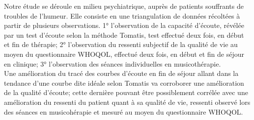   Notre étude se déroule en milieu psychiatrique, 
auprès de patients souffrants de troubles de l'humeur. Elle consiste en une triangulation de données 
récoltées à partir de plusieurs observations.  
1° l'observation de la capacité d'écoute, révélée par un test 
d'écoute selon la méthode Tomatis\textsuperscript \textregistered, test effectué deux fois, en début et 
fin de thérapie;
2° l'observation du ressenti subjectif de la qualité de vie au moyen du 
questionnaire WHOQOL, effectué deux fois, en début et fin de séjour en clinique;
3° l'observation des séances  individuelles en musicothérapie. 
\\
Une amélioration du tracé des courbes d'écoute en fin de séjour allant dans la tendance d'une courbe 
dite idéale selon Tomatis va corroborer une amélioration de la qualité d'écoute; cette dernière pouvant 
être 
possiblement corrélée avec une amélioration du ressenti du patient quant à sa qualité de vie, ressenti 
observé lors des séances en musicohérapie et 
mesuré au moyen du questionnaire WHOQOL.










